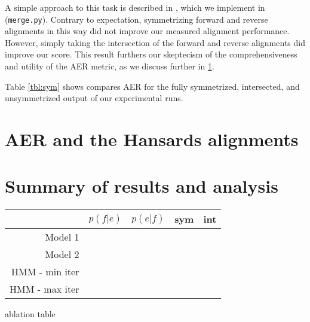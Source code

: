 \documentclass{article}
\begin{document}
\begin{figure}
\begin{center}
\end{center}
\label{fig:etof}
\end{figure}

A simple approach to this task is described in \cite{koehn}, which we implement in ({\tt merge.py}). Contrary to expectation, symmetrizing forward and reverse alignments in this way did not improve our measured alignment performance. However, simply taking the intersection of the forward and reverse alignments did improve our score. This result furthers our skeptecism of the comprehensiveness and utility of the AER metric, as we discuss further in \ref{aer}.

Table \ref{tbl:sym} shows compares AER for the fully symmetrized, intersected, and unsymmetrized output of our experimental runs.

\section{AER and the Hansards alignments}
\label{aer}

\section{Summary of results and analysis}

\begin{table}
\begin{center}
\begin{tabular}{r|cccc}
    & $p(f|e)$ & $p(e|f)$ & sym & int\\ \hline
    Model 1 & & & & \\
    Model 2 & & & & \\
    HMM - min iter & & & & \\
    HMM - max iter & & & & \\

\end{tabular}
\end{center}
\end{table}


ablation table
\end{document}

